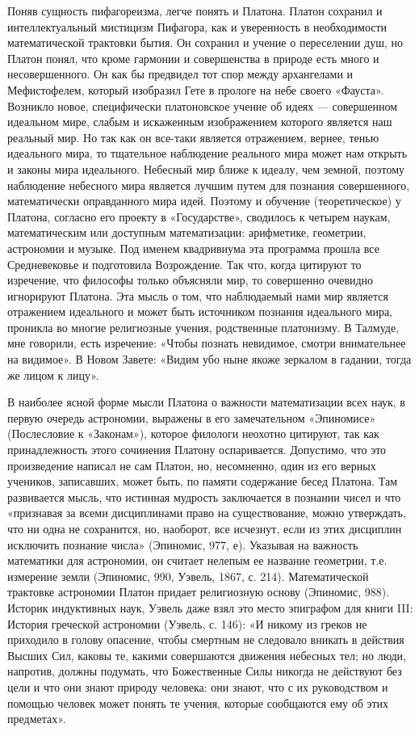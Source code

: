 Поняв сущность пифагореизма, легче понять и Платона. Платон
сохранил и интеллектуальный мистицизм Пифагора, как и уверенность в
необходимости математической трактовки бытия. Он сохранил и учение о
переселении душ, но Платон понял, что кроме гармонии и совершенства в
природе есть много и несовершенного. Он как бы предвидел тот спор
между архангелами и Мефистофелем, который изобразил Гете в прологе на
небе своего «Фауста». Возникло новое, специфически платоновское учение
об идеях --- совершенном идеальном мире, слабым и искаженным
изображением которого является наш реальный мир. Но так как он
все-таки является отражением, вернее, тенью идеального мира, то
тщательное наблюдение реального мира может нам открыть и законы мира
идеального. Небесный мир ближе к идеалу, чем земной, поэтому
наблюдение небесного мира является лучшим путем для познания
совершенного, математически оправданного мира идей. Поэтому и обучение
(теоретическое) у Платона, согласно его проекту в «Государстве»,
сводилось к четырем наукам, математическим или доступным
математизации: арифметике, геометрии, астрономии и музыке. Под именем
квадривиума эта программа прошла все Средневековье и подготовила
Возрождение. Так что, когда цитируют то изречение, что философы только
объясняли мир, то совершенно очевидно игнорируют Платона. Эта мысль о
том, что наблюдаемый нами мир является отражением идеального и может
быть источником познания идеального мира, проникла во многие
религиозные учения, родственные платонизму. В Талмуде, мне говорили,
есть изречение: «Чтобы познать невидимое, смотри внимательнее на
видимое». В Новом Завете: «Видим убо ныне якоже зеркалом в гадании,
тогда же лицом к лицу».

В наиболее ясной форме мысли Платона о важности математизации всех
наук, в первую очередь астрономии, выражены в его замечательном
«Эпиномисе» (Послесловие к «Законам»), которое филологи неохотно
цитируют, так как принадлежность этого сочинения Платону оспаривается.
Допустимо, что это произведение написал не сам Платон, но, несомненно,
один из его верных учеников, записавших, может быть, по памяти
содержание бесед Платона. Там развивается мысль, что истинная мудрость
заключается в познании чисел и что «признавая за всеми дисциплинами
право на существование, можно утверждать, что ни одна не сохранится,
но, наоборот, все исчезнут, если из этих дисциплин исключить познание
числа» (Эпиномис, 977, е). Указывая на важность математики для
астрономии, он считает нелепым ее название геометрии, т.е. измерение
земли (Эпиномис, 990, Уэвель, 1867, с. 214). Математической трактовке
астрономии Платон придает религиозную основу (Эпиномис, 988). Историк
индуктивных наук, Уэвель даже взял это место эпиграфом для книги III:
История греческой астрономии (Уэвель, с. 146): «И никому из греков не
приходило в голову опасение, чтобы смертным не следовало вникать в
действия Высших Сил, каковы те, какими совершаются движения небесных
тел; но люди, напротив, должны подумать, что Божественные Силы никогда
не действуют без цели и что они знают природу человека: они знают, что
с их руководством и помощью человек может понять те учения, которые
сообщаются ему об этих предметах».

